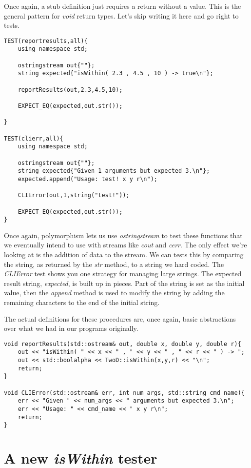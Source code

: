 \documentclass[nobib]{tufte-handout}
\begin{document}
Once again, a stub definition just requires a return without a value. This is the general pattern for \textit{void} return types. Let's skip writing it here and go right to tests.
\begin{verbatim}
TEST(reportresults,all){
    using namespace std;

    ostringstream out{""};
    string expected{"isWithin( 2.3 , 4.5 , 10 ) -> true\n"};

    reportResults(out,2.3,4.5,10);

    EXPECT_EQ(expected,out.str());

}

TEST(clierr,all){
    using namespace std;

    ostringstream out{""};
    string expected{"Given 1 arguments but expected 3.\n"};
    expected.append("Usage: test! x y r\n");

	CLIError(out,1,string("test!"));

    EXPECT_EQ(expected,out.str());
}
\end{verbatim}
Once again, polymorphism lets us use \textit{ostringstream} to test these functions that we eventually intend to use with streams like \textit{cout} and \textit{cerr}. The only effect we're looking at is the addition of data to the stream. We can tests this by comparing the string, as returned by the \textit{str} method, to a string we hard coded. The \textit{CLIError} test shows you one strategy for managing large strings. The expected result string, \textit{expected}, is built up in pieces. Part of the string is set as the initial value, then the \textit{append} method is used to modify the string by adding the remaining characters to the end of the initial string. 

The actual definitions for these procedures are, once again, basic abstractions over what we had in our programs originally.
\begin{verbatim}
void reportResults(std::ostream& out, double x, double y, double r){
    out << "isWithin( " << x << " , " << y << " , " << r << " ) -> ";
    out << std::boolalpha << TwoD::isWithin(x,y,r) << "\n";
    return;
}

void CLIError(std::ostream& err, int num_args, std::string cmd_name){
    err << "Given " << num_args << " arguments but expected 3.\n";
    err << "Usage: " << cmd_name << " x y r\n";
    return;
}
\end{verbatim}

\section{A new \textit{isWithin} tester}
\end{document}
